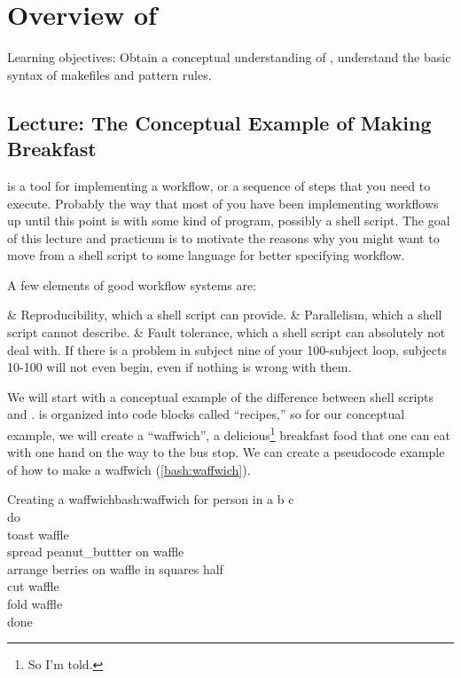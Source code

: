 \renewcommand{\chaptername}{Practical}
\renewcommand{\chapterautorefname}{Practical}
\chapter{Overview of \maken{}}
Learning objectives: Obtain a conceptual understanding of \maken{}, understand the basic syntax of makefiles and pattern rules.
\label{sec:practicum1}
\section{Lecture: The Conceptual Example of Making Breakfast}

\maken{} is a tool for implementing a workflow, or a sequence of steps that you need to execute. Probably the way that most of you have been implementing workflows up until this point is with some kind of program, possibly a shell script. The goal of this lecture and practicum is to motivate the reasons why you might want to move from a shell script to some language for better specifying workflow.

A few elements of good workflow systems are:
\begin{easylist}[itemize]
	& Reproducibility, which a shell script can provide.
	& Parallelism, which a shell script cannot describe.
	& Fault tolerance, which a shell script can absolutely not deal with. If there is a problem in subject nine of your 100-subject loop, subjects 10-100 will not even begin, even if nothing is wrong with them.
\end{easylist}

We will start with a conceptual example of the difference between shell scripts and \maken{}. \maken{} is organized into code blocks called ``recipes,'' so for our conceptual example, we will create a ``waffwich'', a delicious\footnote{So I'm told.} breakfast food that one can eat with one hand on the way to the bus stop. We can create a pseudocode   example of how to make a waffwich (\autoref{bash:waffwich}).
\begin{bash}{Creating a waffwich}{bash:waffwich}
	for person in a b c \\
	do \\
	toast waffle \\
	spread peanut_buttter \dd on waffle \\
	arrange berries \dd on waffle \dd in squares \dd half \\
	cut waffle \\ 
	fold waffle \\
	done
\end{bash}

